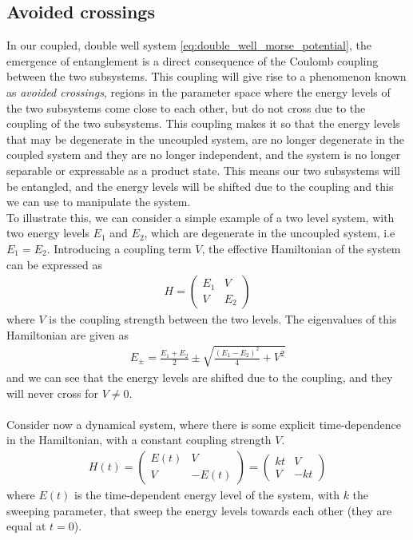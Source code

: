 \documentclass{subfiles}
\begin{document}
\subsection{Avoided crossings}\label{sec:avoided_crossings}
In our coupled, double well system \eqref{eq:double_well_morse_potential}, the emergence of entanglement is a direct consequence of the Coulomb coupling between the two subsystems. This coupling will give rise to a phenomenon known as \emph{avoided crossings}\cite{nazir2005anticrossings}, regions in the parameter space where the energy levels of the two subsystems come close to each other, but do not cross due to the coupling of the two subsystems. This coupling makes it so that the energy levels that may be degenerate in the uncoupled system, are no longer degenerate in the coupled system and they are no longer independent, and the system is no longer separable or expressable as a product state. This means our two subsystems will be entangled, and the energy levels will be shifted due to the coupling and this we can use to manipulate the system. \\ 

To illustrate this, we can consider a simple example of a two level system, with two energy levels $E_1$ and $E_2$, which are degenerate in the uncoupled system, i.e $E_1 = E_2$. Introducing a coupling term $V$, the effective Hamiltonian of the system can be expressed as
\begin{align*}
    H = \begin{pmatrix}
        E_1 & V \\
        V & E_2
    \end{pmatrix}
\end{align*}
where $V$ is the coupling strength between the two levels. The eigenvalues of this Hamiltonian are given as
\begin{align*}
    E_\pm = \frac{E_1 + E_2}{2} \pm \sqrt{\frac{(E_1 - E_2)^2}{4} + V^2}
\end{align*}
and we can see that the energy levels are shifted due to the coupling, and they will never cross for $V\neq0$. \\ \\

Consider now a dynamical system, where there is some explicit time-dependence in the Hamiltonian, with a constant coupling strength $V$.
\begin{align}
    H(t) = \begin{pmatrix}
        E(t) & V \\
        V & -E(t)
    \end{pmatrix} = \begin{pmatrix}
        kt & V \\
        V & -kt
    \end{pmatrix} \label{eq:landau_zener}
\end{align}
where $E(t)$ is the time-dependent energy level of the system, with $k$ the sweeping parameter, that sweep the energy levels towards each other (they are equal at $t=0$). 
\end{document}

